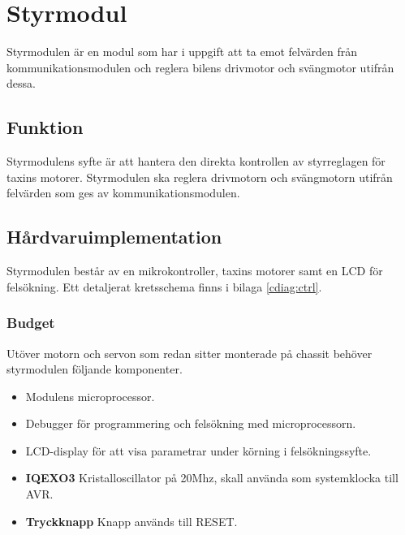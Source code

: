 \documentclass[designspec/spec.tex]{subfiles}
\begin{document}
\section{Styrmodul}
Styrmodulen är en modul som har i uppgift att ta emot felvärden från
kommunikationsmodulen och reglera bilens drivmotor och svängmotor utifrån
dessa.

\subsection{Funktion}
Styrmodulens syfte är att hantera den direkta kontrollen av styrreglagen för
taxins motorer. Styrmodulen ska reglera drivmotorn och svängmotorn utifrån
felvärden som ges av kommunikationsmodulen.

\subsection{Hårdvaruimplementation}
Styrmodulen består av en mikrokontroller, taxins motorer samt en LCD för
felsökning. Ett detaljerat kretsschema finns i bilaga \ref{cdiag:ctrl}.

\subsubsection{Budget}
Utöver motorn och servon som redan sitter monterade på chassit behöver
styrmodulen följande komponenter.
\begin{itemize}
	\item \textbf{\modMicrocontroller} Modulens microprocessor. 
    \item \textbf{\modJtag} Debugger för programmering och felsökning med
        microprocessorn. 
    \item \textbf{\modLcd} LCD-display för att visa parametrar under körning i
        felsökningssyfte.
    \item \textbf{IQEXO3} Kristalloscillator på 20Mhz, skall använda som systemklocka till AVR.
    \item \textbf{Tryckknapp} Knapp används till RESET.
\end{itemize}
\end{document}
